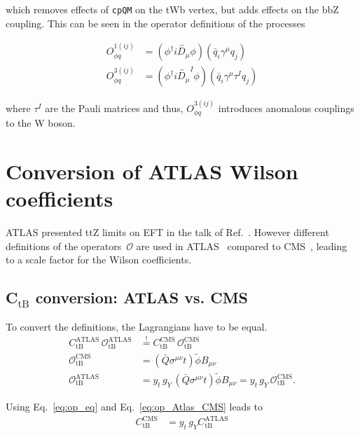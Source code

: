 \documentclass[letterpaper,11pt]{article}
\begin{document}
\noindent
which removes effects of \texttt{cpQM} on the tWb vertex, but adds effects on the bbZ coupling.
This can be seen in the operator definitions of the processes

\begin{align}
	O_{\phi q}^{1(ij)} &= (\phi^\dag i\overleftrightarrow{D_\mu}\phi)(\bar{q}_i\gamma^\mu q_j)\\
	O_{\phi q}^{3(ij)} &= (\phi^\dag  i\overleftrightarrow{D_\mu}^I\phi)(\bar{q}_i\gamma^\mu \tau^I q_j)
\end{align}

\noindent
where $\tau^I$ are the Pauli matrices and thus, $O_{\phi q}^{3(ij)}$ introduces anomalous couplings to the W boson.
\clearpage

\section{Conversion of ATLAS Wilson coefficients}
ATLAS presented ttZ limits on EFT in the talk of Ref.~\cite{ATLAS:Top2018}.
However different definitions of the operators~$\mathcal{O}$ are used in ATLAS~\cite{Bylund:2016phk} compared to CMS~\cite{AguilarSaavedra:2018nen}, leading to a scale factor for the Wilson coefficients.

\subsection{C$_\text{tB}$ conversion: ATLAS vs. CMS}
\label{sec:ATLAS_CMS_tB}

To convert the definitions, the Lagrangians have to be equal.
\begin{align}
	C_\text{tB}^\text{ATLAS}\,\mathcal{O}^\text{ATLAS}_\text{tB} &\stackrel{!}{=} C_\text{tB}^\text{CMS}\,\mathcal{O}^\text{CMS}_\text{tB}\label{eq:op_eq}\\
	\mathcal{O}^\text{CMS}_\text{tB} &= \left(\bar{Q}\sigma^{\mu\nu}t\right)\tilde{\phi}B_{\mu\nu}\\
	\mathcal{O}^\text{ATLAS}_\text{tB} &= y_t\,g_Y\,\left(\bar{Q}\sigma^{\mu\nu}t\right)\tilde{\phi}B_{\mu\nu} = y_t\,g_Y\,\mathcal{O}^\text{CMS}_\text{tB}.\label{eq:op_Atlas_CMS}
\end{align}

\noindent
Using Eq.~\ref{eq:op_eq} and Eq.~\ref{eq:op_Atlas_CMS} leads to
\begin{align}
	C_\text{tB}^\text{CMS} &= y_t\,g_Y C_\text{tB}^\text{ATLAS}
\end{align}
\end{document}

